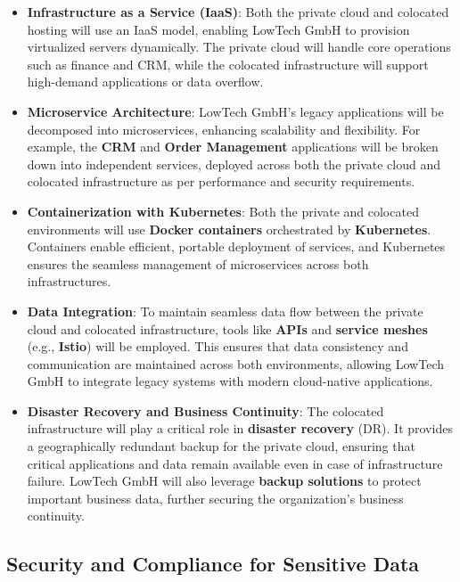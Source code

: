 \begin{itemize}
    \item \textbf{Infrastructure as a Service (IaaS)}: Both the private cloud and colocated hosting will use an IaaS model, enabling LowTech GmbH to provision virtualized servers dynamically. The private cloud will handle core operations such as finance and CRM, while the colocated infrastructure will support high-demand applications or data overflow.
    
    \item \textbf{Microservice Architecture}: LowTech GmbH’s legacy applications will be decomposed into microservices, enhancing scalability and flexibility. For example, the \textbf{CRM} and \textbf{Order Management} applications will be broken down into independent services, deployed across both the private cloud and colocated infrastructure as per performance and security requirements.
    
    \item \textbf{Containerization with Kubernetes}: Both the private and colocated environments will use \textbf{Docker containers} orchestrated by \textbf{Kubernetes}. Containers enable efficient, portable deployment of services, and Kubernetes ensures the seamless management of microservices across both infrastructures.
    
    \item \textbf{Data Integration}: To maintain seamless data flow between the private cloud and colocated infrastructure, tools like \textbf{APIs} and \textbf{service meshes} (e.g., \textbf{Istio}) will be employed. This ensures that data consistency and communication are maintained across both environments, allowing LowTech GmbH to integrate legacy systems with modern cloud-native applications.
    
    \item \textbf{Disaster Recovery and Business Continuity}: The colocated infrastructure will play a critical role in \textbf{disaster recovery} (DR). It provides a geographically redundant backup for the private cloud, ensuring that critical applications and data remain available even in case of infrastructure failure. LowTech GmbH will also leverage \textbf{backup solutions} to protect important business data, further securing the organization’s business continuity.
\end{itemize}

\subsection{Security and Compliance for Sensitive Data}

